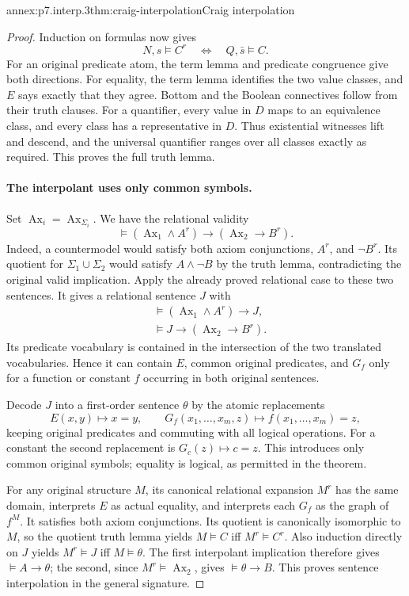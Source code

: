 \begin{annexitem}{annex:p7.interp.3}{thm:craig-interpolation}{Craig interpolation}
\begin{proof}
Induction on formulas now gives
\[
 N,s\models C^r
 \quad\Longleftrightarrow\quad Q,\bar s\models C.
\]
For an original predicate atom, the term lemma and predicate congruence
give both directions.  For equality, the term lemma identifies the
two value classes, and \(E\) says exactly that they agree.
Bottom and the Boolean connectives follow from their truth clauses.
For a quantifier, every value in \(D\) maps to an equivalence class,
and every class has a representative in \(D\).  Thus existential
witnesses lift and descend, and the universal quantifier ranges
over all classes exactly as required.  This proves the full truth lemma.

\paragraph{The interpolant uses only common symbols.}
Set \(\operatorname{Ax}_i=\operatorname{Ax}_{\Sigma_i}\).
We have the relational validity
\[
 \models(\operatorname{Ax}_1\land A^r)
                 \to(\operatorname{Ax}_2\to B^r).
\]
Indeed, a countermodel would satisfy both axiom conjunctions,
\(A^r\), and \(\neg B^r\).
Its quotient for \(\Sigma_1\cup\Sigma_2\) would satisfy
\(A\land\neg B\) by the truth lemma, contradicting the original
valid implication.
Apply the already proved relational case to these two sentences.
It gives a relational sentence \(J\) with
\[
\begin{aligned}
 &\models(\operatorname{Ax}_1\land A^r)\to J,\\
 &\models J\to(\operatorname{Ax}_2\to B^r).
\end{aligned}
\]
Its predicate vocabulary is contained in the intersection of the
two translated vocabularies.  Hence it can contain \(E\), common
original predicates, and \(G_f\) only for a function or constant
\(f\) occurring in both original sentences.

Decode \(J\) into a first-order sentence \(\theta\) by the atomic
replacements
\[
 E(x,y)\mapsto x=y,\qquad
 G_f(x_1,\ldots,x_m,z)\mapsto f(x_1,\ldots,x_m)=z,
\]
keeping original predicates and commuting with all logical operations.
For a constant the second replacement is \(G_c(z)\mapsto c=z\).
This introduces only common original symbols; equality is logical,
as permitted in the theorem.

For any original structure \(M\), its canonical relational expansion
\(M^r\) has the same domain, interprets \(E\) as actual equality,
and interprets each \(G_f\) as the graph of \(f^M\).
It satisfies both axiom conjunctions.
Its quotient is canonically isomorphic to \(M\), so the quotient
truth lemma yields \(M\models C\) iff \(M^r\models C^r\).
Also induction directly on \(J\) yields
\(M^r\models J\) iff \(M\models\theta\).
The first interpolant implication therefore gives
\(\models A\to\theta\); the second, since \(M^r\models
\operatorname{Ax}_2\), gives \(\models\theta\to B\).
This proves sentence interpolation in the general signature.


\end{proof}
\end{annexitem}
